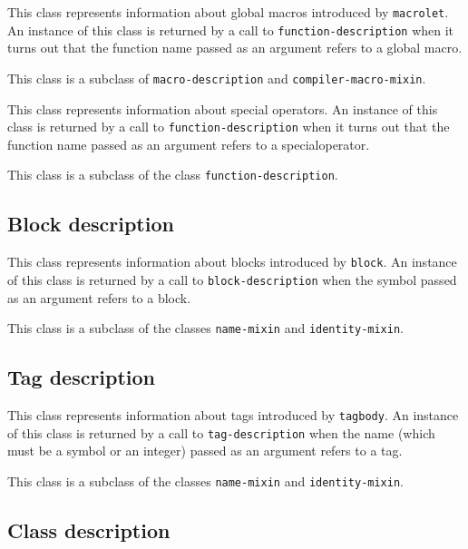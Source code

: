 
This class represents information about global macros introduced by
\texttt{macrolet}.  An instance of this class is returned by a call to
\texttt{function-description} when it turns out that the function name passed
as an argument refers to a global macro.

This class is a subclass of \texttt{macro-description} and \texttt{compiler-macro-mixin}.


This class represents information about special operators.  An
instance of this class is returned by a call to \texttt{function-description}
when it turns out that the function name passed as an argument refers
to a specialoperator.

This class is a subclass of the class \texttt{function-description}.

\subsection{Block description}


This class represents information about blocks introduced by
\texttt{block}.  An instance of this class is returned by a call to
\texttt{block-description} when the symbol passed as an argument refers to a
block.

This class is a subclass of the classes \texttt{name-mixin} and
\texttt{identity-mixin}.

\subsection{Tag description}


This class represents information about tags introduced by
\texttt{tagbody}.  An instance of this class is returned by a call to
\texttt{tag-description} when the name (which must be a symbol or an integer)
passed as an argument refers to a tag.

This class is a subclass of the classes \texttt{name-mixin} and
\texttt{identity-mixin}.

\subsection{Class description}


